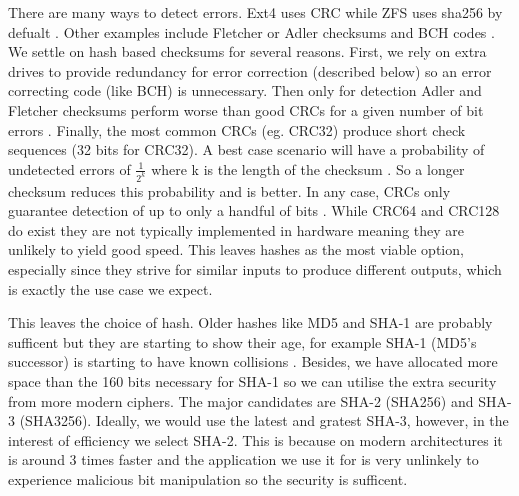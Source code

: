 
        There are many ways to detect errors. Ext4 uses CRC \cite{ext4_docs}
        while ZFS uses sha256 by defualt \cite{ZFS_docs}. Other examples
        include Fletcher or Adler checksums \cite{embedded_checksums} and BCH
        codes \cite{flash_error_manual}. We settle on hash based checksums for
        several reasons. First, we rely on extra drives to provide redundancy
        for error correction (described below) so an error correcting code
        (like BCH) is unnecessary. Then only for detection Adler and Fletcher
        checksums perform worse than good CRCs for a given number of bit errors
        \citeauthor{embedded_checksums}. Finally, the most common CRCs (eg.
        CRC32) produce short check sequences (32 bits for CRC32). A best case
        scenario will have a probability of undetected errors of
        $\frac{1}{2^k}$ where k is the length of the checksum
        \cite{embedded_checksums}. So a longer checksum reduces this
        probability and is better. In any case, CRCs only guarantee detection
        of up to only a handful of bits \cite{embedded_checksums}. While CRC64
        and CRC128 do exist they are not typically implemented in hardware
        meaning they are unlikely to yield good speed. This leaves hashes as
        the most viable option, especially since they strive for similar inputs
        to produce different outputs, which is exactly the use case we expect.

        This leaves the choice of hash. Older hashes like MD5 and SHA-1 are
        probably sufficent but they are starting to show their age, for example
        SHA-1 (MD5's successor) is starting to have known collisions
        \cite{SHA_collision}. Besides, we have allocated more space than the
        160 bits necessary for SHA-1 so we can utilise the extra security from
        more modern ciphers. The major candidates are SHA-2 (SHA256) and SHA-3
        (SHA3256). Ideally, we would use the latest and gratest SHA-3, however,
        in the interest of efficiency we select SHA-2. This is because on
        modern architectures it is around 3 times faster \cite{hash_stats} and
        the application we use it for is very unlinkely to experience malicious
        bit manipulation so the security is sufficent.


